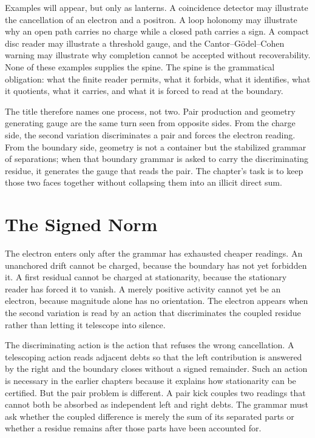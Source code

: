 Examples will appear, but only as lanterns. A coincidence detector may
illustrate the cancellation of an electron and a positron. A loop holonomy
may illustrate why an open path carries no charge while a closed path carries
a sign. A compact disc reader may illustrate a threshold gauge, and the
Cantor--G\"odel--Cohen warning may illustrate why completion cannot be
accepted without recoverability. None of these examples supplies the spine.
The spine is the grammatical obligation: what the finite reader permits,
what it forbids, what it identifies, what it quotients, what it carries, and
what it is forced to read at the boundary.

The title therefore names one process, not two. Pair production and geometry
generating gauge are the same turn seen from opposite sides. From the charge
side, the second variation discriminates a pair and forces the electron
reading. From the boundary side, geometry is not a container but the
stabilized grammar of separations; when that boundary grammar is asked to
carry the discriminating residue, it generates the gauge that reads the pair.
The chapter's task is to keep those two faces together without collapsing
them into an illicit direct sum.

\section{The Signed Norm}

The electron enters only after the grammar has exhausted cheaper readings.
An unanchored drift cannot be charged, because the boundary has not yet
forbidden it. A first residual cannot be charged at stationarity, because the
stationary reader has forced it to vanish. A merely positive activity cannot
yet be an electron, because magnitude alone has no orientation. The electron
appears when the second variation is read by an action that discriminates the
coupled residue rather than letting it telescope into silence.

The discriminating action is the action that refuses the wrong cancellation.
A telescoping action reads adjacent debts so that the left contribution is
answered by the right and the boundary closes without a signed remainder.
Such an action is necessary in the earlier chapters because it explains how
stationarity can be certified. But the pair problem is different. A pair kick
couples two readings that cannot both be absorbed as independent left and
right debts. The grammar must ask whether the coupled difference is merely
the sum of its separated parts or whether a residue remains after those
parts have been accounted for.

